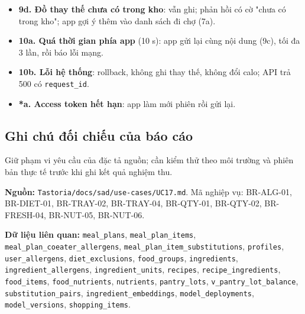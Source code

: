 \begin{itemize}
\item \textbf{9d. Đồ thay thế chưa có trong kho}: vẫn ghi; phản hồi có cờ "chưa có trong kho"; app gợi ý thêm vào danh sách đi chợ (7a).
\item \textbf{10a. Quá thời gian phía app} (10 s): app gửi lại cùng nội dung (9c), tối đa 3 lần, rồi báo lỗi mạng.
\item \textbf{10b. Lỗi hệ thống}: rollback, không ghi thay thế, không đổi calo; API trả 500 có {\small\texttt{request\_\allowbreak{}\allowbreak{}id}}.
\item \textbf{*a. Access token hết hạn}: app làm mới phiên rồi gửi lại.
\end{itemize}
\subsection{Ghi chú đối chiếu của báo cáo}
Giữ phạm vi yêu cầu của đặc tả nguồn; cần kiểm thử theo môi trường và phiên bản thực tế trước khi ghi kết quả nghiệm thu.

\textbf{Nguồn:} {\small\texttt{Tastoria/\allowbreak{}\allowbreak{}docs/\allowbreak{}\allowbreak{}sad/\allowbreak{}\allowbreak{}use-\allowbreak{}cases/\allowbreak{}\allowbreak{}UC17.\allowbreak{}md}}. Mã nghiệp vụ: BR-\allowbreak{}ALG-\allowbreak{}01, BR-\allowbreak{}DIET-\allowbreak{}01, BR-\allowbreak{}TRAY-\allowbreak{}02, BR-\allowbreak{}TRAY-\allowbreak{}04, BR-\allowbreak{}QTY-\allowbreak{}01, BR-\allowbreak{}QTY-\allowbreak{}02, BR-\allowbreak{}FRESH-\allowbreak{}04, BR-\allowbreak{}NUT-\allowbreak{}05, BR-\allowbreak{}NUT-\allowbreak{}06.

\textbf{Dữ liệu liên quan:} {\small\texttt{meal\_\allowbreak{}\allowbreak{}plans}}, {\small\texttt{meal\_\allowbreak{}\allowbreak{}plan\_\allowbreak{}\allowbreak{}items}}, {\small\texttt{meal\_\allowbreak{}\allowbreak{}plan\_\allowbreak{}\allowbreak{}coeater\_\allowbreak{}\allowbreak{}allergens}}, {\small\texttt{meal\_\allowbreak{}\allowbreak{}plan\_\allowbreak{}\allowbreak{}item\_\allowbreak{}\allowbreak{}substitutions}}, {\small\texttt{profiles}}, {\small\texttt{user\_\allowbreak{}\allowbreak{}allergens}}, {\small\texttt{diet\_\allowbreak{}\allowbreak{}exclusions}}, {\small\texttt{food\_\allowbreak{}\allowbreak{}groups}}, {\small\texttt{ingredients}}, {\small\texttt{ingredient\_\allowbreak{}\allowbreak{}allergens}}, {\small\texttt{ingredient\_\allowbreak{}\allowbreak{}units}}, {\small\texttt{recipes}}, {\small\texttt{recipe\_\allowbreak{}\allowbreak{}ingredients}}, {\small\texttt{food\_\allowbreak{}\allowbreak{}items}}, {\small\texttt{food\_\allowbreak{}\allowbreak{}nutrients}}, {\small\texttt{nutrients}}, {\small\texttt{pantry\_\allowbreak{}\allowbreak{}lots}}, {\small\texttt{v\_\allowbreak{}\allowbreak{}pantry\_\allowbreak{}\allowbreak{}lot\_\allowbreak{}\allowbreak{}balance}}, {\small\texttt{substitution\_\allowbreak{}\allowbreak{}pairs}}, {\small\texttt{ingredient\_\allowbreak{}\allowbreak{}embeddings}}, {\small\texttt{model\_\allowbreak{}\allowbreak{}deployments}}, {\small\texttt{model\_\allowbreak{}\allowbreak{}versions}}, {\small\texttt{shopping\_\allowbreak{}\allowbreak{}items}}.

